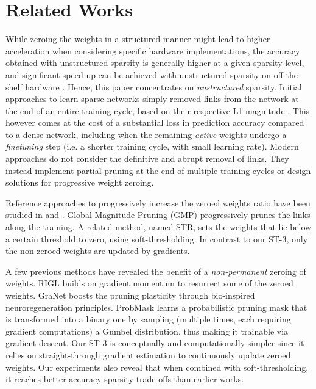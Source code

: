 \documentclass[10pt,twocolumn,letterpaper]{article}
\begin{document}
\section{Related Works}
\label{sec:sota}
While zeroing the weights in a structured manner might lead to higher acceleration when considering specific hardware implementations, the accuracy obtained with unstructured sparsity is generally higher at a given sparsity level\cite{Li2017,He2019a,Wang2020},
and significant speed up can be achieved with unstructured sparsity on off-the-shelf hardware \cite{Kalchbrenner2018,Park2017,Gale2019,Mishra2021}. Hence, this paper concentrates on \emph{unstructured} sparsity. 
Initial approaches to learn sparse networks simply removed links from the network at the end of an entire training cycle, based on their respective L1 magnitude \cite{LeCun1990,Han2015}. This however comes at the cost of a substantial loss in prediction accuracy compared to a dense network, including when the remaining \emph{active} weights undergo a \emph{finetuning} step (i.e. a shorter training cycle, with small learning rate).
Modern approaches do not consider the definitive and abrupt removal of links. They instead implement partial pruning at the end of multiple training cycles or design solutions for progressive weight zeroing.


Reference approaches to progressively increase the zeroed weights ratio have been studied in \cite{Zhu2018} and \cite{Kusupati2020}. Global Magnitude Pruning (GMP) \cite{Zhu2018} progressively prunes the links along the training. A related method, named STR, sets the weights that lie below a certain threshold to zero, using soft-thresholding. In contrast to our ST-3, only the non-zeroed weights are updated by gradients. 

A few previous methods have revealed the benefit of a {\it non-permanent} zeroing of weights. RIGL \cite{Evci2020} builds on gradient momentum to resurrect some of the zeroed weights. GraNet \cite{Liu2021} boosts the pruning plasticity through bio-inspired neuroregeneration principles. ProbMask \cite{Zhou2021} learns a probabilistic pruning mask that is transformed into a binary one by sampling (multiple times, each requiring gradient computations) a Gumbel distribution, thus making it trainable via gradient descent. Our ST-3 is conceptually and computationally simpler since it relies on straight-through gradient estimation to continuously update zeroed weights. Our experiments also reveal that when combined with soft-thresholding, it reaches better accuracy-sparsity trade-offs than earlier works.
\end{document}
